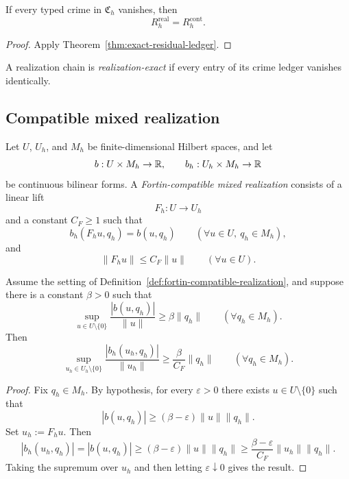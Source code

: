 \begin{corollary}
\label{cor:no-hidden-crime}
If every typed crime in \(\mathfrak C_h\) vanishes, then
\[
R_h^{\mathrm{real}}=R_h^{\mathrm{cont}}.
\]
\end{corollary}

\begin{proof}
Apply Theorem~\ref{thm:exact-residual-ledger}.
\end{proof}

\begin{definition}
\label{def:realization-exactness}
A realization chain is \emph{realization-exact} if every entry of its crime
ledger vanishes identically.
\end{definition}

\subsection{Compatible mixed realization}

\begin{definition}
\label{def:fortin-compatible-realization}
Let \(U\), \(U_h\), and \(M_h\) be finite-dimensional Hilbert spaces, and let
\[
b:U\times M_h\to \mathbb{R},
\qquad
b_h:U_h\times M_h\to \mathbb{R}
\]
be continuous bilinear forms. A \emph{Fortin-compatible mixed realization}
consists of a linear lift
\[
F_h:U\to U_h
\]
and a constant \(C_F\ge 1\) such that
\[
b_h(F_hu,q_h)=b(u,q_h)
\qquad
(\forall u\in U,\ q_h\in M_h),
\]
and
\[
\|F_hu\|\le C_F\|u\|
\qquad
(\forall u\in U).
\]
\end{definition}

\begin{theorem}
\label{thm:discrete-infsup-from-fortin}
Assume the setting of Definition~\ref{def:fortin-compatible-realization}, and
suppose there is a constant \(\beta>0\) such that
\[
\sup_{u\in U\setminus\{0\}}
\frac{|b(u,q_h)|}{\|u\|}
\ge
\beta\|q_h\|
\qquad
(\forall q_h\in M_h).
\]
Then
\[
\sup_{u_h\in U_h\setminus\{0\}}
\frac{|b_h(u_h,q_h)|}{\|u_h\|}
\ge
\frac{\beta}{C_F}\|q_h\|
\qquad
(\forall q_h\in M_h).
\]
\end{theorem}

\begin{proof}
Fix \(q_h\in M_h\). By hypothesis, for every \(\varepsilon>0\) there exists
\(u\in U\setminus\{0\}\) such that
\[
|b(u,q_h)|
\ge
(\beta-\varepsilon)\|u\|\|q_h\|.
\]
Set \(u_h:=F_hu\). Then
\[
|b_h(u_h,q_h)|
=
|b(u,q_h)|
\ge
(\beta-\varepsilon)\|u\|\|q_h\|
\ge
\frac{\beta-\varepsilon}{C_F}\|u_h\|\|q_h\|.
\]
Taking the supremum over \(u_h\) and then letting \(\varepsilon\downarrow 0\)
gives the result.
\end{proof}

